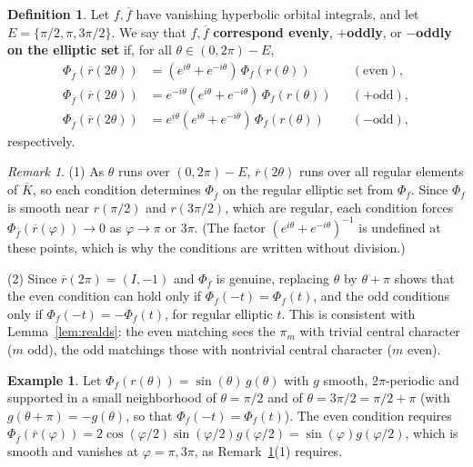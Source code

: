 \documentclass[12pt,letterpaper]{book}
\theoremstyle{plain}
\theoremstyle{definition}
\newtheorem{definition}[theorem]{Definition}
\newtheorem{example}[theorem]{Example}
\theoremstyle{remark}
\newtheorem{remark}[theorem]{Remark}
\theoremstyle{remark}
\begin{document}
\begin{definition}\label{def:realds-corr}
Let $f,\overline{f}$ have vanishing hyperbolic orbital integrals, and let
$E=\{\pi/2,\pi,3\pi/2\}$. We say that $f,\overline f$
\textbf{correspond evenly}, \textbf{$+$oddly}, or \textbf{$-$oddly}
\textbf{on the elliptic set} if, for all $\theta\in(0,2\pi)-E$,
\begin{align*}
\Phi_{\overline{f}}(\overline{r}(2\theta ))
&=(e^{i\theta }+e^{-i\theta })\,\Phi_f(r(\theta )) &&(\mathrm{even}),\\
\Phi_{\overline{f}}(\overline{r}(2\theta ))
&=e^{-i\theta}(e^{i\theta }+e^{-i\theta })\,\Phi_f(r(\theta )) &&(+\mathrm{odd}),\\
\Phi_{\overline{f}}(\overline{r}(2\theta ))
&=e^{i\theta}(e^{i\theta }+e^{-i\theta })\,\Phi_f(r(\theta )) &&(-\mathrm{odd}),
\end{align*}
respectively.
\end{definition}

\begin{remark}\label{rem:realds-consistency}
(1) As $\theta$ runs over $(0,2\pi)-E$, $\overline r(2\theta)$ runs over
all regular elements of $\overline K$, so each condition determines
$\Phi_{\overline f}$ on the regular elliptic set from $\Phi_f$. Since
$\Phi_f$ is smooth near $r(\pi/2)$ and $r(3\pi/2)$, which are regular,
each condition forces $\Phi_{\overline f}(\overline r(\varphi))\rightarrow0$
as $\varphi\rightarrow\pi$ or $3\pi$. (The factor
$(e^{i\theta}+e^{-i\theta})^{-1}$ is undefined at these points, which is
why the conditions are written without division.)

(2) Since $\overline r(2\pi)=(I,-1)$ and $\Phi_{\overline f}$ is genuine,
replacing $\theta$ by $\theta+\pi$ shows that the even condition can hold
only if $\Phi_f(-t)=\Phi_f(t)$, and the odd conditions only if
$\Phi_f(-t)=-\Phi_f(t)$, for regular elliptic $t$. This is consistent
with Lemma~\ref{lem:realds}: the even matching sees the $\pi_m$ with
trivial central character ($m$ odd), the odd matchings those with
nontrivial central character ($m$ even).
\end{remark}

\begin{example}
Let $\Phi_f(r(\theta))=\sin(\theta)\,g(\theta)$ with $g$ smooth,
$2\pi$-periodic and supported in a small neighborhood of $\theta=\pi/2$
and of $\theta=3\pi/2=\pi/2+\pi$ (with $g(\theta+\pi)=-g(\theta)$, so that
$\Phi_f(-t)=\Phi_f(t)$). The even condition requires
$\Phi_{\overline f}(\overline r(\varphi))=2\cos(\varphi/2)\sin(\varphi/2)g(\varphi/2)
=\sin(\varphi)g(\varphi/2)$, which is smooth and vanishes at
$\varphi=\pi,3\pi$, as Remark~\ref{rem:realds-consistency}(1) requires.
\end{example}
\end{document}
